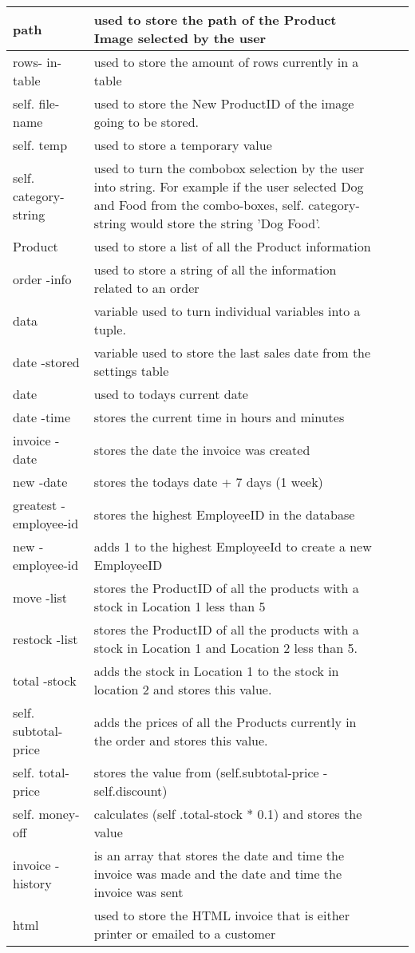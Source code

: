 \begin{longtable}{|p{1.5cm}|p{4.5cm}|p{2cm}|p{2cm}|}
	path & used to store the path of the Product Image selected by the user & & \\ \hline
	rows- in-table & used to store the amount of rows currently in a table & & \\ \hline
	self. file-name & used to store the New ProductID of the image going to be stored. & & \\ \hline
	self. temp & used to store a temporary value & & \\ \hline
	self. category-string & used to turn the combobox selection by the user into string. For example if the user selected Dog and Food from the combo-boxes, self. category-string would store the string 'Dog Food'.& & \\ \hline
	Product & used to store a list of all the Product information & & \\ \hline
	order -info & used to store a string of all the information related to an order & & \\ \hline
	data & variable used to turn individual variables into a tuple. & & \\ \hline
	date -stored & variable used to store the last sales date from the settings table & & \\ \hline
	date & used to  todays current date & & \\ \hline
	date -time & stores the current time in hours and minutes & & \\ \hline
	invoice -date & stores the date the invoice was created & & \\ \hline
	new -date & stores the todays date + 7 days (1 week) & & \\ \hline
	greatest -employee-id & stores the highest EmployeeID in the database & & \\ \hline
	new -employee-id & adds 1 to the highest EmployeeId to create a new EmployeeID & & \\ \hline
	move -list & stores the ProductID of all the products with a stock in Location 1 less than 5 & & \\ \hline
	restock -list & stores the ProductID of all the products with a stock in Location 1 and Location 2 less than 5. & & \\ \hline
	total -stock & adds the stock in Location 1 to the stock in location 2 and stores this value. & & \\ \hline
	self. subtotal-price & adds the prices of all the Products currently in the order and stores this value.& & \\ \hline
	self. total-price & stores the value from (self.subtotal-price - self.discount) & & \\ \hline
	self. money-off & calculates (self .total-stock * 0.1) and stores the value & & \\ \hline
	invoice -history & is an array that stores the date and time the invoice was made and the date and time the invoice was sent & & \\ \hline
	html & used to store the HTML invoice that is either printer or emailed to a customer& & \\ \hline
	\end{longtable}
	
